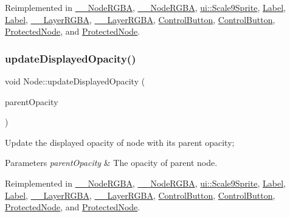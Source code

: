 Reimplemented in \hyperlink{class____NodeRGBA_a7b792b469020beebcd515a2eacba90f7}{\+\_\+\+\_\+\+Node\+R\+G\+BA}, \hyperlink{class____NodeRGBA_a7b792b469020beebcd515a2eacba90f7}{\+\_\+\+\_\+\+Node\+R\+G\+BA}, \hyperlink{classui_1_1Scale9Sprite_a130c78092b506d4b06fec469e80c554c}{ui\+::\+Scale9\+Sprite}, \hyperlink{classLabel_a5810437c76649477d86f278a15e5f260}{Label}, \hyperlink{classLabel_a22ddaa3b9fb25f6295dcd5ac9545202b}{Label}, \hyperlink{class____LayerRGBA_aa0406779f58fc6586f51129bee7aed36}{\+\_\+\+\_\+\+Layer\+R\+G\+BA}, \hyperlink{class____LayerRGBA_aa0406779f58fc6586f51129bee7aed36}{\+\_\+\+\_\+\+Layer\+R\+G\+BA}, \hyperlink{classControlButton_ab493879910cbb468f4f510a3e9393203}{Control\+Button}, \hyperlink{classControlButton_a3f7857c3ce4bec5b375db1a6efea5920}{Control\+Button}, \hyperlink{classProtectedNode_ab628cf3ac452302f0c653600bb145b49}{Protected\+Node}, and \hyperlink{classProtectedNode_a53b09aefb1db2c87f6ee6560b0c48430}{Protected\+Node}.

\mbox{\label{classNode_a3a0122884e7e1ce310b8b68abfbb245b}} 
\subsubsection{\texorpdfstring{update\+Displayed\+Opacity()}{updateDisplayedOpacity()}\hspace{0.1cm}{\footnotesize\ttfamily [1/2]}}
{\footnotesize\ttfamily void Node\+::update\+Displayed\+Opacity (\begin{DoxyParamCaption}\item[{G\+Lubyte}]{parent\+Opacity }\end{DoxyParamCaption})\hspace{0.3cm}{\ttfamily [virtual]}}

Update the displayed opacity of node with it\textquotesingle{}s parent opacity; 
\begin{DoxyParams}{Parameters}
{\em parent\+Opacity} & The opacity of parent node. \\
\hline
\end{DoxyParams}


Reimplemented in \hyperlink{class____NodeRGBA_a428c41148bb3d1fe27d7eac80bb6df59}{\+\_\+\+\_\+\+Node\+R\+G\+BA}, \hyperlink{class____NodeRGBA_a428c41148bb3d1fe27d7eac80bb6df59}{\+\_\+\+\_\+\+Node\+R\+G\+BA}, \hyperlink{classui_1_1Scale9Sprite_a85bca0738c6bff049fe0a962d285bda4}{ui\+::\+Scale9\+Sprite}, \hyperlink{classLabel_a89d48e49df588b91d259cac6f8732162}{Label}, \hyperlink{classLabel_a20eff3ff123e54a021c4149a7fcf0494}{Label}, \hyperlink{class____LayerRGBA_a53e78a19fb9780fec84476f1bce1d3f6}{\+\_\+\+\_\+\+Layer\+R\+G\+BA}, \hyperlink{class____LayerRGBA_a53e78a19fb9780fec84476f1bce1d3f6}{\+\_\+\+\_\+\+Layer\+R\+G\+BA}, \hyperlink{classControlButton_a0d46b6a123c22e09c50e786b6dd5c68f}{Control\+Button}, \hyperlink{classControlButton_a51a1da3e1972b7e1d98e2318feaf498e}{Control\+Button}, \hyperlink{classProtectedNode_aef8f27d6204a82d0ed5372e9082d12ae}{Protected\+Node}, and \hyperlink{classProtectedNode_abe8e7d89709e01b0500ae8cf63991806}{Protected\+Node}.

